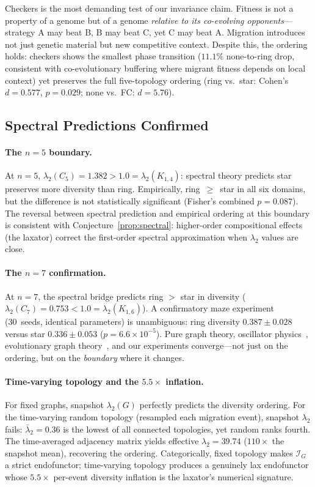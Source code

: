 \documentclass[submission,copyright,creativecommons]{eptcs}
\begin{document}
Checkers is the most demanding test of our invariance claim.
Fitness is not a property of a genome but of a genome \emph{relative
to its co-evolving opponents}---strategy A may beat B, B may beat C,
yet C may beat A. Migration introduces not just genetic material but
new competitive context. Despite this, the ordering holds:
checkers shows the smallest phase transition ($11.1\%$
none-to-ring drop, consistent with co-evolutionary buffering where
migrant fitness depends on local context) yet preserves the full
five-topology ordering (ring vs.\ star: Cohen's $d = 0.577$,
$p = 0.029$; none vs.\ FC: $d = 5.76$).

\subsection{Spectral Predictions Confirmed}
\label{sec:spectral-confirm}

\paragraph{The $n{=}5$ boundary.}
At $n{=}5$, $\lambda_2(C_5) = 1.382 > 1.0 = \lambda_2(K_{1,4})$:
spectral theory predicts star preserves more diversity than ring.
Empirically, ring~$\geq$~star in all six domains, but the
difference is not statistically significant (Fisher's combined
$p = 0.087$). The reversal between spectral prediction and
empirical ordering at this boundary is consistent with
Conjecture~\ref{prop:spectral}: higher-order compositional
effects (the laxator) correct the first-order spectral
approximation when $\lambda_2$ values are close.

\paragraph{The $n{=}7$ confirmation.}
At $n{=}7$, the spectral bridge predicts ring $>$ star in diversity
($\lambda_2(C_7) = 0.753 < 1.0 = \lambda_2(K_{1,6})$). A
confirmatory maze experiment (30~seeds, identical parameters) is
unambiguous: ring diversity $0.387 \pm 0.028$ versus star
$0.336 \pm 0.053$ ($p = 6.6 \times 10^{-5}$). Pure graph theory,
oscillator physics~\cite{sanz2026algebraic}, evolutionary graph
theory~\cite{brewster2025diversity}, and our experiments
converge---not just on the ordering, but on the \emph{boundary}
where it changes.

\paragraph{Time-varying topology and the $5.5\times$ inflation.}
For fixed graphs, snapshot $\lambda_2(G)$ perfectly predicts the
diversity ordering. For the time-varying random topology (resampled
each migration event), snapshot $\lambda_2$ fails:
$\bar{\lambda}_2 = 0.36$ is the lowest of all connected topologies,
yet random ranks fourth. The time-averaged adjacency matrix yields
effective $\lambda_2 = 39.74$ ($110\times$ the snapshot mean),
recovering the ordering. Categorically, fixed topology makes
$\mathcal{I}_G$ a strict endofunctor; time-varying topology produces
a genuinely lax endofunctor whose $5.5\times$ per-event diversity
inflation is the laxator's numerical signature.
\end{document}
